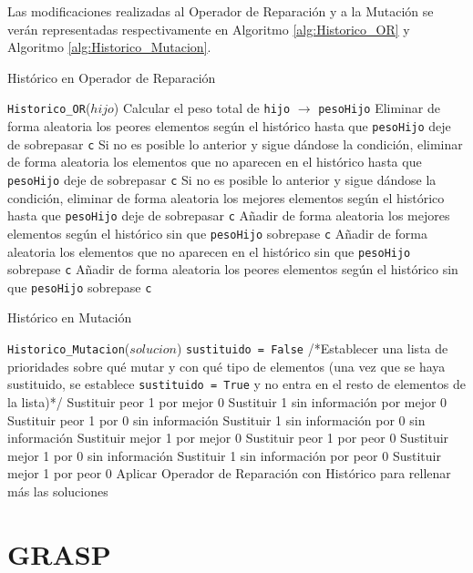 Las modificaciones realizadas al Operador de Reparación y a la Mutación se verán representadas respectivamente en Algoritmo \ref{alg:Historico_OR} y Algoritmo \ref{alg:Historico_Mutacion}.

\begin{algorithm}
\caption{Histórico en Operador de Reparación}\label{alg:Historico_OR}
\begin{algorithmic}[1]
\Procedure \texttt{Historico\_OR}($hijo$)
\State Calcular el peso total de \texttt{hijo} $\xrightarrow{}{}$ \texttt{pesoHijo}
	\State Eliminar de forma aleatoria los peores elementos según el histórico hasta que \texttt{pesoHijo} deje de sobrepasar \texttt{c}
	\State Si no es posible lo anterior y sigue dándose la condición, eliminar de forma aleatoria los elementos que no aparecen en el histórico hasta que \texttt{pesoHijo} deje de sobrepasar \texttt{c}
	\State Si no es posible lo anterior y sigue dándose la condición, eliminar de forma aleatoria los mejores elementos según el histórico hasta que \texttt{pesoHijo} deje de sobrepasar \texttt{c}
\Else
	\State Añadir de forma aleatoria los mejores elementos según el histórico sin que \texttt{pesoHijo} sobrepase \texttt{c}
	\State Añadir de forma aleatoria los elementos que no aparecen en el histórico sin que \texttt{pesoHijo} sobrepase \texttt{c}
	\State Añadir de forma aleatoria los peores	elementos según el histórico sin que \texttt{pesoHijo} sobrepase \texttt{c}
\EndIf
\EndProcedure
\end{algorithmic}
\end{algorithm}

\begin{algorithm}
\caption{Histórico en Mutación}\label{alg:Historico_Mutacion}
\begin{algorithmic}[1]
\Procedure \texttt{Historico\_Mutacion}($solucion$)
\State \texttt{sustituido = False}
  /*Establecer una lista de prioridades sobre qué mutar y con qué tipo de elementos (una vez que se haya sustituido, se establece \texttt{sustituido = True} y no entra en el resto de elementos de la lista)*/
	\State Sustituir peor 1 por mejor 0
	\State Sustituir 1 sin información por mejor 0
	\State Sustituir peor 1 por 0 sin información
	\State Sustituir 1 sin información por 0 sin información
	\State Sustituir mejor 1 por mejor 0
	\State Sustituir peor 1 por peor 0
	\State Sustituir mejor 1 por 0 sin información 
	\State Sustituir 1 sin información por peor 0
	\State Sustituir mejor 1 por peor 0
\EndIf
\State Aplicar Operador de Reparación con Histórico para rellenar más las soluciones
\EndProcedure
\end{algorithmic}
\end{algorithm}

\section{GRASP}
